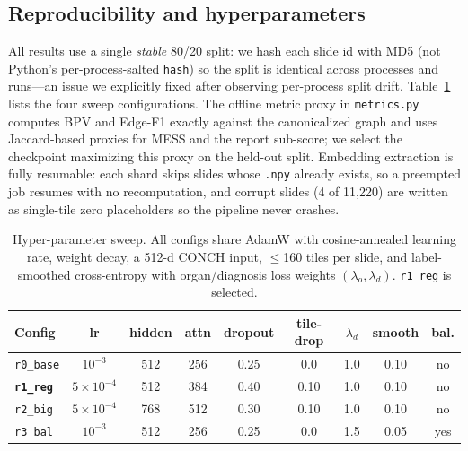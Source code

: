 \documentclass[11pt,a4paper]{article}
\newcommand{\code}[1]{\texttt{\small #1}}
\begin{document}
\subsection{Reproducibility and hyperparameters}
\label{sec:repro}
All results use a single \emph{stable} 80/20 split: we hash each slide id with MD5 (not Python's
per-process-salted \code{hash}) so the split is identical across processes and runs---an issue we
explicitly fixed after observing per-process split drift. Table~\ref{tab:hparams} lists the four
sweep configurations. The offline metric proxy in \code{metrics.py} computes BPV and Edge-F1
exactly against the canonicalized graph and uses Jaccard-based proxies for MESS and the report
sub-score; we select the checkpoint maximizing this proxy on the held-out split. Embedding
extraction is fully resumable: each shard skips slides whose \code{.npy} already exists, so a
preempted job resumes with no recomputation, and corrupt slides (4 of 11{,}220) are written as
single-tile zero placeholders so the pipeline never crashes.

\begin{table}[h]
\centering
\caption{Hyper-parameter sweep. All configs share AdamW with cosine-annealed learning rate,
weight decay, a 512-d CONCH input, $\le$160 tiles per slide, and label-smoothed cross-entropy
with organ/diagnosis loss weights $(\lambda_o,\lambda_d)$. \code{r1\_reg} is selected.}
\label{tab:hparams}
\begin{tabular}{lcccccccc}
\toprule
Config & lr & hidden & attn & dropout & tile-drop & $\lambda_d$ & smooth & bal. \\
\midrule
\code{r0\_base} & $10^{-3}$ & 512 & 256 & 0.25 & 0.0 & 1.0 & 0.10 & no \\
\textbf{\code{r1\_reg}} & $5{\times}10^{-4}$ & 512 & 384 & 0.40 & 0.10 & 1.0 & 0.10 & no \\
\code{r2\_big} & $5{\times}10^{-4}$ & 768 & 512 & 0.30 & 0.10 & 1.0 & 0.10 & no \\
\code{r3\_bal} & $10^{-3}$ & 512 & 256 & 0.25 & 0.0 & 1.5 & 0.05 & yes \\
\bottomrule
\end{tabular}
\end{table}
\end{document}
